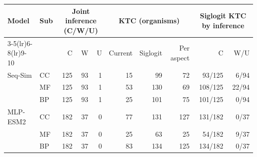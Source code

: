 \begin{tabular}{llrrrrrrrr}
\toprule
Model & Sub & \multicolumn{3}{c}{Joint inference (C/W/U)} & \multicolumn{3}{c}{KTC (organisms)} & \multicolumn{2}{c}{Siglogit KTC by inference} \\
\cmidrule(lr){3-5}\cmidrule(lr){6-8}\cmidrule(lr){9-10}
& & C & W & U & Current & Siglogit & Per aspect & C & W/U \\
\midrule
Seq-Sim & CC & 125 & 93 & 1 & 15 & 99 & 72 & 93/125 & 6/94 \\
 & MF & 125 & 93 & 1 & 53 & 130 & 69 & 108/125 & 22/94 \\
 & BP & 125 & 93 & 1 & 25 & 101 & 75 & 101/125 & 0/94 \\
\midrule
MLP-ESM2 & CC & 182 & 37 & 0 & 77 & 131 & 127 & 131/182 & 0/37 \\
 & MF & 182 & 37 & 0 & 25 & 63 & 25 & 54/182 & 9/37 \\
 & BP & 182 & 37 & 0 & 83 & 134 & 125 & 134/182 & 0/37 \\
\bottomrule
\end{tabular}
